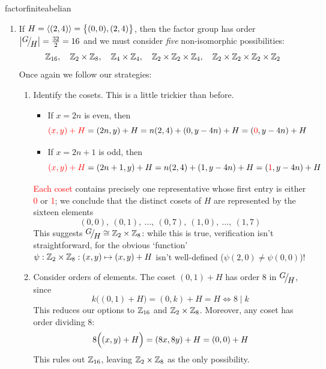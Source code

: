 \begin{examples}{}{factorfiniteabelian}
\begin{enumerate}
		\goodbreak
	
		\item\label{ex:factoriso3} If $H=\left\langle (2,4)\right\rangle=\bigl\{(0,0),(2,4)\bigr\}$, then the factor group has order $\nm{\quotient GH}=\frac{32}2=16$ and we must consider \emph{five} non-isomorphic possibilities:\footnotemark{}
		\[
			\mathbb{Z}_{16},\quad \mathbb{Z}_2\times\mathbb{Z}_8,\quad \mathbb{Z}_4\times\mathbb{Z}_4,\quad \mathbb{Z}_2\times\mathbb{Z}_2\times\mathbb{Z}_4,\quad \mathbb{Z}_2\times\mathbb{Z}_2\times\mathbb{Z}_2\times\mathbb{Z}_2
		\]
		Once again we follow our strategies:
		\begin{enumerate}
		  \item Identify the cosets. This is a little trickier than before.
		  \begin{itemize}
	  		\item If $x=2n$ is even, then
	  		\[
	  			\textcolor{red}{(x,y)+H}
	  			=(2n,y)+H
	  			=n(2,4)+(0,y-4n)+H
	  			=(\textcolor{red}{0},y-4n)+H
	  		\]
	  		\item If $x=2n+1$ is odd, then
	  		\[
	  			\textcolor{red}{(x,y)+H}
	  			=(2n+1,y)+H
	  			=n(2,4)+(1,y-4n)+H
	  			=(\textcolor{red}{1},y-4n)+H
	  		\]
	  	\end{itemize}
	 		\textcolor{red}{Each coset} contains precisely one representative whose first entry is either \textcolor{red}{0} or \textcolor{red}{1}; we conclude that the distinct cosets of $H$ are represented by the sixteen elements
			\[
				(0,0),\ (0,1),\ \ldots,\ (0,7),\ (1,0),\ \ldots,\ (1,7) \tag{$(x,y)$ where $x\in\Z_2$, $y\in\Z_8$}
			\]
			This suggests $\quotient GH\cong\Z_2\times\Z_8$: while this is true, verification isn't straightforward, for the obvious `function' $\psi:\mathbb{Z}_2\times\mathbb{Z}_8:(x,y)\mapsto(x,y)+H$ isn't well-defined ($\psi(2,0)\neq\psi(0,0)$)!
		  
			\item Consider orders of elements. The coset $(0,1)+H$ has order 8 in $\quotient GH$, since
			\[
				k\bigl((0,1)+H\bigr)=(0,k)+H=H\iff 8\mid k
			\]
			This reduces our options to $\mathbb{Z}_{16}$ and $\mathbb{Z}_2\times\mathbb{Z}_8$. Moreover, any coset has order dividing 8:
			\[
				8\Bigl((x,y)+H\Bigr)
				=(8x,8y)+H
				=(0,0)+H
			\]
	  	This rules out $\mathbb{Z}_{16}$, leaving $\mathbb{Z}_2\times\mathbb{Z}_8$ as the only possibility.
		\end{enumerate}
	\end{enumerate}
\end{examples}


		
